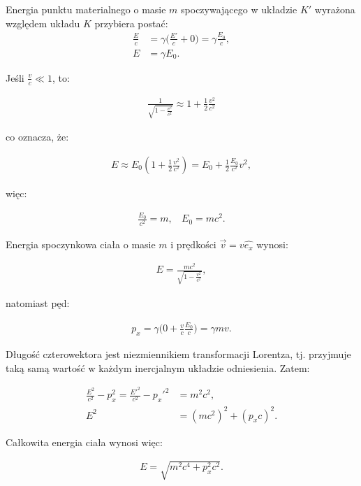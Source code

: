 \documentclass{article}
\begin{document}
\noindent Energia punktu materialnego o masie $m$ spoczywającego w układzie $K'$ wyrażona względem układu $K$ przybiera postać:
\begin{align*}
\frac{E}{c} &= \gamma \biggl(\frac{E'}{c} + 0 \biggr) = \gamma \frac{E_0}{c}, \\
E &= \gamma E_0.
\end{align*}

\noindent Jeśli $\frac{v}{c} \ll 1$, to:

\begin{align*}
\frac{1}{\sqrt{1 - \frac{v^2}{c^2}}} \approx 1 + \frac{1}{2} \frac{v^2}{c^2}
\end{align*}

\noindent co oznacza, że:

\begin{align*}
E \approx E_0 (1+ \frac{1}{2} \frac{v^2}{c^2}) = E_0 + \frac{1}{2} \frac{E_0}{c^2}v^2,
\end{align*}

\noindent więc:

\begin{align*}
\frac{E_0}{c^2} = m, \:\:\:\: E_0 = mc^2.
\end{align*}

\noindent Energia spoczynkowa ciała o masie $m$ i prędkości $\vec{v} = v \hat{e_x}$ wynosi:

\begin{align*}
E = \frac{mc^2}{\sqrt{1 - \frac{v^2}{c^2}}},
\end{align*}

\noindent natomiast pęd:

\begin{align*}
p_x = \gamma \biggl(0 + \frac{v}{c} \frac{E_0}{c}\biggr) = \gamma m v.
\end{align*}

\noindent Długość czterowektora jest niezmiennikiem transformacji Lorentza, tj. przyjmuje taką samą wartość w każdym inercjalnym układzie odniesienia. Zatem:

\begin{align*}
\frac{E^2}{c^2} - p_x^2 = \frac{E'^2}{c^2} - p_x'^2 &= m^2 c^2, \\
E^2 &= (mc^2)^2 + (p_xc)^2.
\end{align*}

\noindent Całkowita energia ciała wynosi więc:

\begin{align*}
E = \sqrt{m^2c^4 + p_x^2c^2}.
\end{align*}
\end{document}
